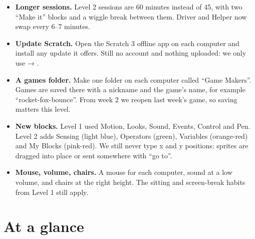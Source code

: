 \begin{teachernote}
\begin{itemize}[leftmargin=1.2em,itemsep=1pt]
  \item \textbf{Longer sessions.} Level 2 sessions are 60 minutes instead of 45, with two \enquote{Make it} blocks and a wiggle break between them. Driver and Helper now swap every 6--7 minutes.
  \item \textbf{Update Scratch.} Open the Scratch 3 offline app on each computer and install any update it offers. Still no account and nothing uploaded: we only use  → .
  \item \textbf{A games folder.} Make one folder on each computer called \enquote{Game Makers}. Games are saved there with a nickname and the game's name, for example \enquote{rocket-fox-bounce}. From week 2 we reopen last week's game, so saving matters this level.
  \item \textbf{New blocks.} Level 1 used Motion, Looks, Sound, Events, Control and Pen. Level 2 adds Sensing (light blue), Operators (green), Variables (orange-red) and My Blocks (pink-red). We still never type x and y positions: sprites are dragged into place or sent somewhere with \enquote{go to}.
  \item \textbf{Mouse, volume, chairs.} A mouse for each computer, sound at a low volume, and chairs at the right height. The sitting and screen-break habits from Level 1 still apply.
\end{itemize}
\end{teachernote}

\section{At a glance}
\begin{timeplan}
\end{timeplan}

